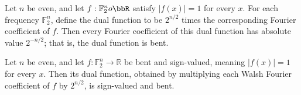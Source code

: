 \begin{theorem}
\label{FABL.IsSignValued.isBent_bentDual}
\leanok
{}
Let $n$ be even, and let $f:\mathbb{F}_2^n	o\bbR$ satisfy $|f(x)|=1$ for every $x$. For each
frequency $\mathbb{F}_2^n$, define the dual function to be $2^{n/2}$ times the corresponding
Fourier coefficient of $f$. Then every Fourier coefficient of this dual function has
absolute value $2^{-n/2}$; that is, the dual function is bent.
\end{theorem}

\begin{theorem}
\label{FABL.IsBent.bentDual}
\leanok
{}
Let $n$ be even, and let $f:\mathbb F_2^n\to\mathbb R$ be bent and sign-valued, meaning
$|f(x)|=1$ for every $x$. Then its dual function, obtained by multiplying each Walsh
Fourier coefficient of $f$ by $2^{n/2}$, is sign-valued and bent.
\end{theorem}
